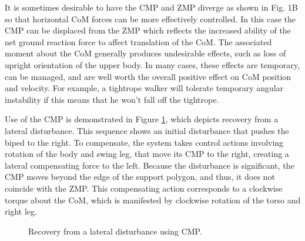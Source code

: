 \documentclass{llncs}
\begin{document}
It is sometimes desirable to have the CMP and ZMP diverge as shown in Fig. 1B so that horizontal CoM forces can be more effectively controlled.  
In this case the CMP can be displaced from the ZMP which reflects the increased ability of the net ground reaction force to 
affect translation of the CoM. 
The associated moment about the CoM generally produces undesirable effects, such as loss of upright orientation of the upper body.  
In many cases, these effects are temporary, can be managed, and are well worth the overall positive effect on CoM position and velocity.  
For example, a tightrope walker will tolerate temporary angular instability if this means that he won’t fall off the tightrope.  

Use of the CMP is demonstrated in Figure \ref{fig:LateralDisturbanceRecovery}, which depicts recovery from a lateral disturbance.  
This sequence shows an initial disturbance that pushes the biped to the right.  
To compensate, the system takes control actions involving rotation of the body and swing leg, that move its CMP to the right, 
creating a lateral compensating force to the left.  
Because the disturbance is significant, the CMP moves beyond the edge of the support polygon, and thus, it does not coincide with the ZMP.  
This compensating action corresponds to a clockwise torque about the CoM, which is manifested by clockwise rotation of the torso and right leg.  

\begin{figure}%
\centering
 \vspace{-10pt}
\caption{Recovery from a lateral disturbance using CMP.}
\label{fig:LateralDisturbanceRecovery}
\end{figure}
\end{document}
